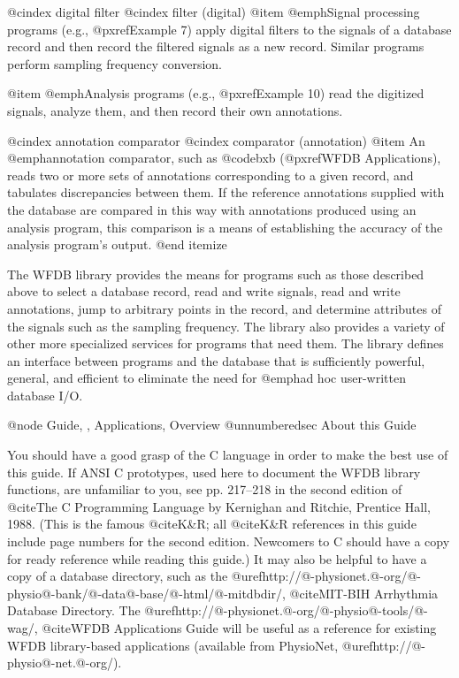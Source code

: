 @cindex digital filter
@cindex filter (digital)
@item
@emph{Signal processing programs} (e.g., @pxref{Example 7}) apply digital
filters to the signals of a database record and then record the filtered
signals as a new record.  Similar programs perform sampling frequency
conversion.

@item
@emph{Analysis programs} (e.g., @pxref{Example 10}) read the digitized
signals, analyze them, and then record their own annotations.

@cindex annotation comparator
@cindex comparator (annotation)
@item
An @emph{annotation comparator}, such as @code{bxb}
(@pxref{WFDB Applications}), reads two or more sets of annotations
corresponding to a given record, and tabulates discrepancies between
them.  If the reference annotations supplied with the database are
compared in this way with annotations produced using an analysis
program, this comparison is a means of establishing the accuracy of the
analysis program's output.
@end itemize

The WFDB library provides the means for programs such as those described
above to select a database record, read and write signals, read and
write annotations, jump to arbitrary points in the record, and determine
attributes of the signals such as the sampling frequency.  The library
also provides a variety of other more specialized services for programs
that need them.  The library defines an interface between programs and
the database that is sufficiently powerful, general, and efficient to
eliminate the need for @emph{ad hoc} user-written database I/O.

@node     Guide, , Applications, Overview
@unnumberedsec About this Guide

You should have a good grasp of the C language in order to make the best
use of this guide.  If ANSI C prototypes, used here to document the WFDB
library functions, are unfamiliar to you, see pp. 217--218 in the second
edition of @cite{The C Programming Language} by Kernighan and Ritchie,
Prentice Hall, 1988.  (This is the famous @cite{K&R}; all @cite{K&R}
references in this guide include page numbers for the second edition.
Newcomers to C should have a copy for ready reference while reading this
guide.)  It may also be helpful to have a copy of a database directory,
such as the
@uref{http://@-physionet.@-org/@-physio@-bank/@-data@-base/@-html/@-mitdbdir/,
@cite{MIT-BIH Arrhythmia Database Directory}}.  The 
@uref{http://@-physionet.@-org/@-physio@-tools/@-wag/,
@cite{WFDB Applications Guide}} will be
useful as a reference for existing WFDB library-based applications
(available from PhysioNet, @uref{http://@-physio@-net.@-org/}).

